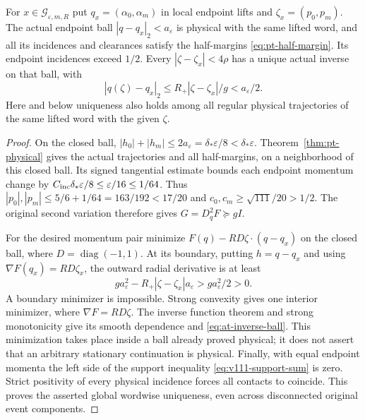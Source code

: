 \begin{lemma}
\label{lem:at-ball}
For $x\in\mathcal G_{\varepsilon,m,R}$ put
$q_x=(\alpha_0,\alpha_m)$ in local endpoint lifts and
$\zeta_x=(p_0,p_m)$.  The actual endpoint ball
$|q-q_x|_2<a_\varepsilon$ is physical with the same lifted word,
and all its incidences and clearances satisfy the half-margins
\eqref{eq:pt-half-margin}.  Its endpoint incidences exceed $1/2$.
Every $|\zeta-\zeta_x|<4\rho$ has a unique actual inverse on
that ball, with
\begin{equation}\label{eq:at-inverse-ball}
 |q(\zeta)-q_x|_2\le R_+|\zeta-\zeta_x|/g<a_\varepsilon/2.
\end{equation}
Here and below uniqueness also holds among all regular physical
trajectories of the same lifted word with the given $\zeta$.
\end{lemma}
\begin{proof}
On the closed ball, $|h_0|+|h_m|\le2a_\varepsilon
=\delta_*\varepsilon/8<\delta_*\varepsilon$.
Theorem~\ref{thm:pt-physical} gives the actual trajectories and all
half-margins, on a neighborhood of this closed ball.  Its signed
tangential estimate bounds each endpoint momentum change by
$C_{\rm inc}\delta_*\varepsilon/8\le\varepsilon/16\le1/64$.
Thus $|p_0|,|p_m|\le5/6+1/64=163/192<17/20$ and
$c_0,c_m\ge\sqrt{111}/20>1/2$.
The original second variation therefore gives $G=D_q^2F\succeq gI$.

For the desired momentum pair minimize
$F(q)-RD\zeta\cdot(q-q_x)$ on the closed ball, where
$D=\operatorname{diag}(-1,1)$.  At its boundary, putting
$h=q-q_x$ and using $\nabla F(q_x)=RD\zeta_x$, the outward
radial derivative is at least
\[
 g a_\varepsilon^2-R_+|\zeta-\zeta_x|a_\varepsilon
 >g a_\varepsilon^2/2>0.
\]
A boundary minimizer is impossible.  Strong convexity gives one
interior minimizer, where $\nabla F=RD\zeta$.
The inverse function theorem and strong monotonicity give its
smooth dependence and \eqref{eq:at-inverse-ball}.  This minimization
takes place inside a ball already proved physical; it does not
assert that an arbitrary stationary continuation is physical.
Finally, with equal endpoint momenta the left side of the support
inequality \eqref{eq:v111-support-sum} is zero.  Strict positivity
of every physical incidence forces all contacts to coincide.
This proves the asserted global wordwise uniqueness, even across
disconnected original event components.
\end{proof}


